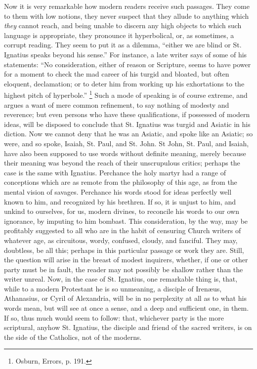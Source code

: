 Now it is very remarkable how modern readers
receive such passages. They come to them with low notions, they never
suspect that they allude to anything which \emph{they} cannot reach,
and being unable to discern any high objects to which such language is
appropriate, they pronounce it hyperbolical, or, as sometimes, a
corrupt reading. They seem to put it as a dilemma, ``either we are
blind or St. Ignatius speaks beyond his sense.'' For instance, a late
writer says of some of his statements: ``No consideration, either
of reason or Scripture, seems to have power for a moment to check the
mad career of his turgid and bloated, but often eloquent, declamation;
or to deter him from working up his exhortations to the highest pitch
of hyperbole.'' \footnote{Osburn, Errors, p. 191.} Such a
mode of speaking is of course extreme, and argues a want of mere
common refinement, to say nothing of modesty and reverence; but even
persons who have these qualifications, if possessed of modern ideas,
will be disposed to conclude that St. Ignatius was turgid and Asiatic
in his diction. Now we cannot deny that he was an Asiatic, and spoke
like an Asiatic; so were, and so spoke, Isaiah, St. Paul, and St.
John. St John, St. Paul, and Isaiah, have also been supposed to use
words without definite meaning, merely because their meaning was
beyond the reach of their unscrupulous critics; perhaps the case is
the same with Ignatius. Perchance the holy martyr had a range of
conceptions which are as remote from the philosophy of this age, as
from the mental vision of savages. Perchance his words stood for ideas
perfectly well known to him, and recognized by his brethren. If so, it
is unjust to him, and unkind to ourselves, for us, modern divines, to
reconcile his words to our own ignorance, by imputing to him bombast.
This consideration, by the way, may be profitably suggested to all who
are in the habit of censuring Church writers of whatever age, as
circuitous, wordy, confused, cloudy, and fanciful. They may,
doubtless, be all this; perhaps in this particular passage or work
they are. Still, the question will arise in the breast of modest
inquirers, whether, if one or other party must be in fault, the reader
may not possibly be shallow rather than the writer unreal. Now, in the
case of St. Ignatius, one remarkable thing is, that, while to a
modern Protestant he is so unmeaning, a disciple of Irenæus,
Athanasius, or Cyril of Alexandria, will be in no perplexity at all as
to what his words mean, but will see at once a sense, and a deep and
sufficient one, in them. If so, thus much would seem to follow: that,
whichever party is the more scriptural, anyhow St. Ignatius, the
disciple and friend of the sacred writers, is on the side of the
Catholics, not of the moderns.

